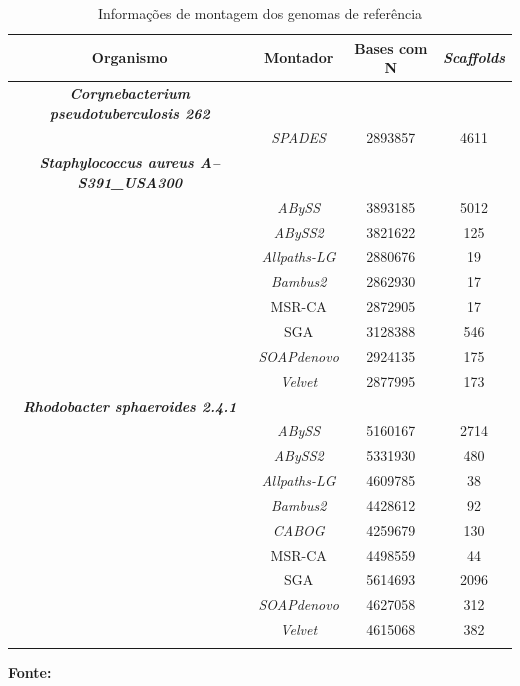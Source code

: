 \documentclass[
	12pt,				%
	openright,			%
	oneside,			%
	a4paper,			%
	chapter=TITLE,		%
	english,			%
	french,				%
	spanish,			%
	brazil				%
	]{abntex2}
\theoremstyle{definition}
\begin{document}
\begin{table}[!htb]
\centering
\caption{Informações de montagem dos genomas de referência}
\label{tab:informacoes_montagem}
\begin{tabular}{cccc}
\toprule
\textbf{Organismo} & \textbf{Montador} & \textbf{Bases com N} & \textbf{\textit{Scaffolds}} \\ \midrule
\rowcolor[HTML]{F3F3F3} 
\textbf{\textit{Corynebacterium pseudotuberculosis 262}} & & & \\
\rowcolor[HTML]{DBDEDE} 
 & \textit{SPADES} & 2893857 & 4611 \\
\rowcolor[HTML]{F3F3F3} 
\textbf{\textit{Staphylococcus aureus A--S391\_USA300}} & & & \\
\rowcolor[HTML]{DBDEDE} 
 & \textit{ABySS} & 3893185 & 5012 \\
\rowcolor[HTML]{F3F3F3} 
 & \textit{ABySS2} & 3821622 & 125 \\
\rowcolor[HTML]{DBDEDE} 
 & \textit{Allpaths-LG} & 2880676 & 19 \\
\rowcolor[HTML]{F3F3F3} 
 & \textit{Bambus2} & 2862930 & 17 \\
\rowcolor[HTML]{DBDEDE} 
 & MSR-CA & 2872905 & 17 \\
\rowcolor[HTML]{F3F3F3} 
 & SGA & 3128388 & 546 \\
\rowcolor[HTML]{DBDEDE} 
 & \textit{SOAPdenovo} & 2924135 & 175 \\
\rowcolor[HTML]{F3F3F3} 
 & \textit{Velvet} & 2877995 & 173 \\
\rowcolor[HTML]{DBDEDE} 
\textbf{\textit{Rhodobacter sphaeroides 2.4.1}} & & & \\
\rowcolor[HTML]{F3F3F3} 
 & \textit{ABySS} & 5160167 & 2714 \\
\rowcolor[HTML]{DBDEDE} 
 & \textit{ABySS2} & 5331930 & 480 \\
\rowcolor[HTML]{F3F3F3} 
 & \textit{Allpaths-LG} & 4609785 & 38 \\
\rowcolor[HTML]{DBDEDE} 
 & \textit{Bambus2} & 4428612 & 92 \\
\rowcolor[HTML]{F3F3F3} 
 & \textit{CABOG} & 4259679 & 130 \\
\rowcolor[HTML]{DBDEDE} 
 & MSR-CA & 4498559 & 44 \\
\rowcolor[HTML]{F3F3F3} 
 & SGA & 5614693 & 2096 \\
\rowcolor[HTML]{DBDEDE} 
 & \textit{SOAPdenovo} & 4627058 & 312 \\
\rowcolor[HTML]{F3F3F3} 
 & \textit{Velvet} & 4615068 & 382 \\ \bottomrule \\
\end{tabular}
\begin{small}\textbf{Fonte: }\end{small}
\end{table}
\end{document}
